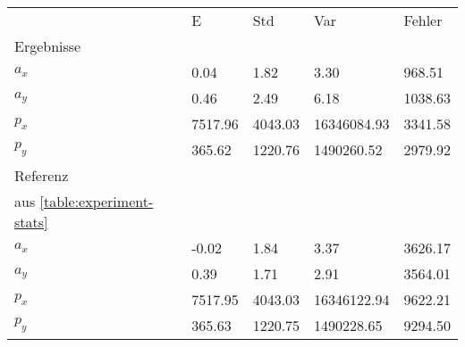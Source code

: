 \begin{tabular}{l|l|l|l|l}

     & E   & Std    & Var    & Fehler \\
\hhline{=|=|=|=|=}

Ergebnisse & & & & \\
$a_x$  &         0.04 &         1.82 &         3.30 &       968.51 \\
$a_y$  &         0.46 &         2.49 &         6.18 &      1038.63 \\
$p_x$  &      7517.96 &      4043.03 &  16346084.93 &      3341.58 \\
$p_y$  &       365.62 &      1220.76 &   1490260.52 &      2979.92 \\

\hline
Referenz & & & & \\
aus \ref{table:experiment-stats} & & & & \\
$a_x$  &        -0.02 &         1.84 &         3.37 &      3626.17 \\
$a_y$  &         0.39 &         1.71 &         2.91 &      3564.01 \\
$p_x$  &      7517.95 &      4043.03 &  16346122.94 &      9622.21 \\
$p_y$  &       365.63 &      1220.75 &   1490228.65 &      9294.50 \\
\end{tabular}
